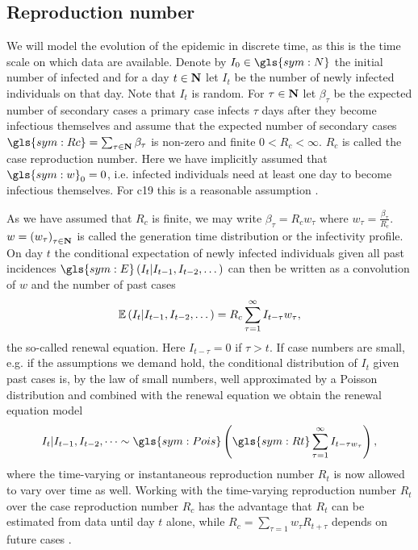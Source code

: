 \subsection{Reproduction number}
\label{subsec:reproduction_number}
We will model the evolution of the epidemic in discrete time, as this is the time scale on which data are available. Denote by $I_{0} \in \gls{sym:N}$ the initial number of infected and for a day $t \in \mathbf N$ let $I_{t}$ be the number of newly infected individuals on that day. Note that $I_{t}$ is random. For $\tau\in\mathbf N$ let $\beta_{\tau}$ be the expected number of secondary cases a primary case infects $\tau$ days after they become infectious themselves and assume that the expected number of secondary cases $
\gls{sym:Rc} = \sum_{\tau \in \N}\beta_{\tau}$ is non-zero and finite $0 < R_{c} < \infty$. $R_{c}$ is called the case reproduction number.  Here we have implicitly assumed that $\gls{sym:w}_{0} = 0$, i.e. infected individuals need at least one day to become infectious themselves. For \acrshort{c19} this is a reasonable assumption \citep{Lauer2020Incubation}. 

As we have assumed that $R_{c}$ is finite, we may write $\beta_{\tau} = R_{c}w_{\tau}$ where $w_{\tau} = \frac{\beta_{\tau}}{R_{c}}$. $w = \left( w_{\tau} \right)_{\tau \in \mathbf N}$ is called the generation time distribution or the infectivity profile. On day $t$ the conditional expectation of newly infected individuals given all past incidences $\gls{sym:E} \left(I_{t}| I_{t - 1}, I_{t - 2}, \dots \right)$  can then be written as a convolution of $w$ and the number of past cases 
\begin{align}
    \label{eq:renewal-eq}
\mathbb E \left(I_{t}| I_{t - 1}, I_{t - 2}, \dots \right) = R_{c} \sum_{\tau = 1}^\infty I_{t - \tau} w_{\tau},
\end{align}
the so-called renewal equation. Here $I_{t - \tau} = 0$ if $\tau > t$. If case numbers are small, e.g. if the assumptions we demand hold, the conditional distribution of $I_{t}$ given past cases is, by the law of small numbers, well approximated by a Poisson distribution and combined with the renewal equation we obtain the renewal equation model \citep{Fraser2007Estimating}
\begin{align}
    \label{eq:renewal-model}
    I_{t} | I_{t - 1}, I_{t - 2}, \dots \sim \gls{sym:Pois} \left( \gls{sym:Rt} \sum _{\tau = 1}^\infty I_{t - \tau w_{\tau}} \right),
\end{align}
where the time-varying or instantaneous reproduction number $R_{t}$ is now allowed to vary over time as well. Working with the time-varying reproduction number $R_{t}$ over the case reproduction number $R_{c}$ has the advantage that $R_{t}$ can be estimated from data until day $t$ alone, while $R_{c} = \sum_{\tau = 1} w_{\tau} R_{ t + \tau }$ depends on future cases \citep{Fraser2007Estimating}. 


